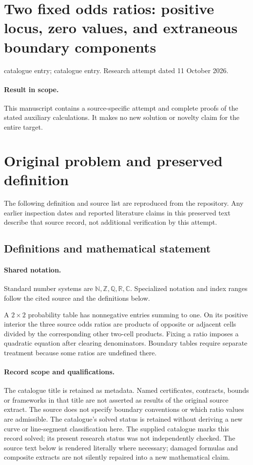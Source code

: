 \documentclass[11pt]{article}
\begin{document}
\section*{Two fixed odds ratios: positive locus, zero values, and extraneous boundary components}
\noindent catalogue entry; catalogue entry. Research attempt dated 11 October 2026.
\paragraph{Result in scope.}This manuscript contains a source-specific attempt and complete proofs of the stated auxiliary calculations. It makes no new solution or novelty claim for the entire target.
\section{Original problem and preserved definition}
The following definition and source list are reproduced from the repository. Any earlier inspection dates and reported literature claims in this preserved text describe that source record, not additional verification by this attempt.
\subsection{Definitions and mathematical statement}

\paragraph{Shared notation.}Standard number systems are $\mathbb N,\mathbb Z,\mathbb Q,\mathbb R,\mathbb C$. Specialized notation and index ranges follow the cited source and the definitions below.


A $2\times2$ probability table has nonnegative entries summing to one. On its positive interior the three source odds ratios are products of opposite or adjacent cells divided by the corresponding other two-cell products. Fixing a ratio imposes a quadratic equation after clearing denominators. Boundary tables require separate treatment because some ratios are undefined there.
\paragraph{Record scope and qualifications.}
The catalogue title is retained as metadata. Named certificates, contracts, bounds or frameworks in that title are not asserted as results of the original source extract.
The source does not specify boundary conventions or which ratio values are admissible. The catalogue's solved status is retained without deriving a new curve or line-segment classification here. The supplied catalogue marks this record solved; its present research status was not independently checked.
The source text below is rendered literally where necessary; damaged formulas and composite extracts are not silently repaired into a new mathematical claim.
\end{document}
